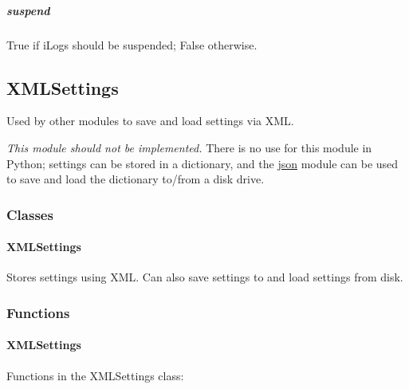 \documentclass[12pt,letterpaper]{article}
\begin{document}
%
%
\subparagraph{suspend}
\label{4.3.2.3.2}

True if iLogs should be suspended; False otherwise.



%
%
\subsection{XMLSettings}
\label{4.4}

Used by other modules to save and load settings via XML.

\emph{This module should not be implemented.} There is no use for this module in Python; settings can be stored in a dictionary, and the \href{http://docs.python.org/library/json.html}{json} module can be used to save and load the dictionary to/from a disk drive.

\setcounter{subsubsection}{-1}



%
%
\subsubsection{Classes}
\label{4.4.0}

\setcounter{paragraph}{-1}



%
%
\paragraph{XMLSettings}
\label{4.4.0.0}

Stores settings using XML. Can also save settings to and load settings from disk.



%
%
\subsubsection{Functions}
\label{4.4.1}

\setcounter{paragraph}{-1}



%
%
\paragraph{XMLSettings}
\label{4.4.1.0}

Functions in the XMLSettings class:

\setcounter{subparagraph}{-1}
\end{document}

